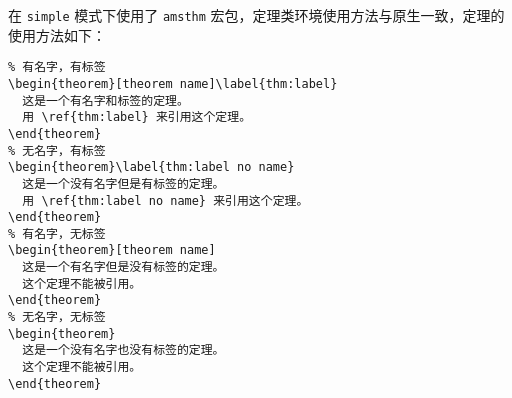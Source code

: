 \documentclass[lang=cn,newtx,10pt,scheme=chinese,color=black]{elegantbook}
\begin{document}
在 \lstinline{simple} 模式下使用了 \lstinline{amsthm} 宏包，定理类环境使用方法与原生一致，定理的使用方法如下：

\begin{lstlisting}
% 有名字，有标签
\begin{theorem}[theorem name]\label{thm:label}
  这是一个有名字和标签的定理。
  用 \ref{thm:label} 来引用这个定理。
\end{theorem}
% 无名字，有标签
\begin{theorem}\label{thm:label no name}
  这是一个没有名字但是有标签的定理。
  用 \ref{thm:label no name} 来引用这个定理。
\end{theorem}
% 有名字，无标签
\begin{theorem}[theorem name]
  这是一个有名字但是没有标签的定理。
  这个定理不能被引用。
\end{theorem}
% 无名字，无标签
\begin{theorem}
  这是一个没有名字也没有标签的定理。
  这个定理不能被引用。
\end{theorem}
\end{lstlisting}


\end{document}

